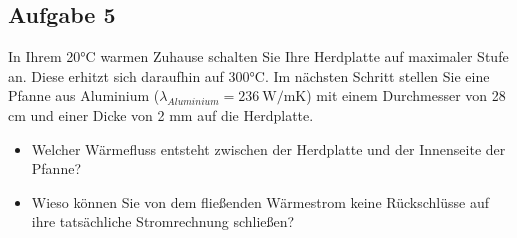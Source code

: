 \documentclass[a4paper,11pt]{article}
\newif\ifshowme
\begin{document}
\subsection*{Aufgabe 5}
In Ihrem 20°C warmen Zuhause schalten Sie Ihre Herdplatte auf maximaler Stufe an. Diese erhitzt sich daraufhin auf 300°C. Im nächsten Schritt stellen Sie eine Pfanne aus Aluminium ($\lambda_{Aluminium} = 236~\text{W/mK}$) mit einem Durchmesser von 28 cm und einer Dicke von 2 mm auf die Herdplatte.
\begin{itemize}
\item Welcher Wärmefluss entsteht zwischen der Herdplatte und der Innenseite der Pfanne?
\ifshowme
\antwort{
\begin{align*}
\dot{Q} &= \lambda_{Al} \cdot \frac{A}{d} \cdot (\Delta T) \\
&= 236~\text{W/mK} \cdot \frac{\pi \cdot 0,15~\text{m}^2}{0,002~\text{m}} \cdot 280~\text{K}\\
&= 4.956.000~\text{J}\\
&= 4.956~\text{kJ}
\end{align*}
}
\else
\fi

\item Wieso können Sie von dem fließenden Wärmestrom keine Rückschlüsse auf ihre tatsächliche Stromrechnung schließen?
\ifshowme
\antwort{
Das Delta T wird mit der Zeit immer geringer. Die Herdplatte muss anfänglich eine viel größere Leistung aufbringen um die kalte Herdplatte (bzw auch die Pfanne) zu erhitzen.
}
\else
\fi

\end{itemize}
\end{document}
